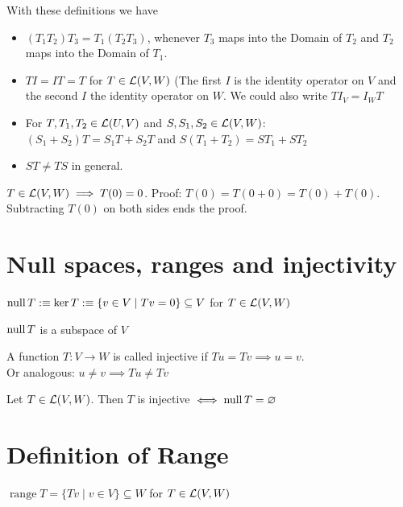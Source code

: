 \begin{thm}
    With these definitions we have
    \begin{itemize}
    	\item {} $(T_1 T_2) T_3 = T_1 (T_2 T_3)$, whenever $T_3$ maps into the Domain of $T_2$ and $T_2$ maps into the Domain of $T_1$.
    	\item {} $T I = I T = T$ for $T \in {\mathcal{L}(V,W)}$ (The first $I$ is the identity operator on $V$ and the second $I$ the identity operator on $W$. We could also write $T I_V = I_W T$
    	\item {} For $T, T_1, T_2 \in {\mathcal{L}(U, V)}$ and $S, S_1, S_2 \in {\mathcal{L}(V, W)}$: \\ $(S_1 + S_2)T=S_1 T + S_2 T$ and $S(T_1 + T_2)=S T_1 + S T_2$
    	\item {} $ST \neq TS$ in general.
    \end{itemize}
\end{thm}

\setcounter{thm}{9}
\begin{thm}
     $T\in {\mathcal{L}(V,W)} \implies T(0)=0$. Proof: $T(0) = T(0+0) = T(0) + T(0)$. Subtracting $T(0)$ on both sides ends the proof.
\end{thm}

\section{Null spaces, ranges and injectivity}
$\operatorname{null} T :\equiv \ker T :\equiv \{ v \in V \mid Tv=0\} \subseteq V$ for $T \in {\mathcal{L}(V,W)}$

\setcounter{thm}{12}
\begin{thm}
    $\operatorname{null} T$ is a subspace of $V$
\end{thm}

\setcounter{thm}{13}
\begin{mydef}
    A function $T: V \to W$ is called injective if $Tu = Tv \implies u = v$. \\
Or analogous: $u \neq v \implies Tu \neq Tv$ 
\end{mydef}

\setcounter{thm}{14}
\begin{mydef}
    Let $T \in {\mathcal{L}(V,W)}$. Then $T$ is injective $\iff \operatorname{null} T = \varnothing$
\end{mydef}

\section{Definition of Range}
\setcounter{thm}{15}
\begin{thm}
    $\operatorname{range}T= \{Tv \mid v \in V\} \subseteq W$ for $T \in {\mathcal{L}(V,W)}$
\end{thm}

